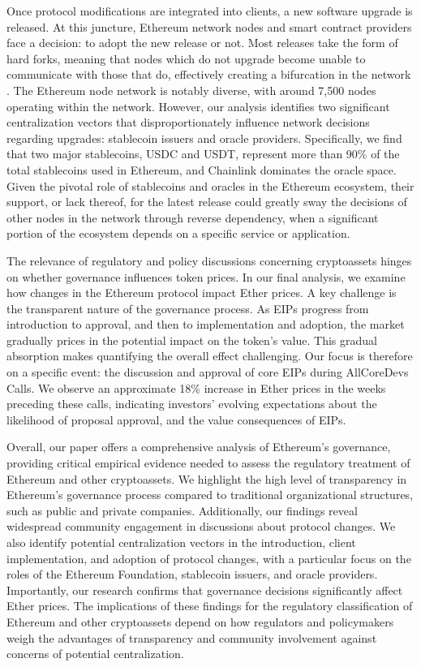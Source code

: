 \documentclass[No]{AEA}
\begin{document}
Once protocol modifications are integrated into clients, a new software upgrade is released. At this juncture, Ethereum network nodes and smart contract providers face a decision: to adopt the new release or not. Most releases take the form of hard forks, meaning that nodes which do not upgrade become unable to communicate with those that do, effectively creating a bifurcation in the network \citep{FS:20}. The Ethereum node network is notably diverse, with around 7,500 nodes operating within the network. However, our analysis identifies two significant centralization vectors that disproportionately influence network decisions regarding upgrades: stablecoin issuers and oracle providers. Specifically, we find that two major stablecoins, USDC and USDT, represent more than 90\% of the total stablecoins used in Ethereum, and Chainlink dominates the oracle space. Given the pivotal role of stablecoins and oracles in the Ethereum ecosystem, their support, or lack thereof, for the latest release could greatly sway the decisions of other nodes in the network through reverse dependency, when a significant portion of the ecosystem depends on a specific service or application. 

The relevance of regulatory and policy discussions concerning cryptoassets hinges on whether governance influences token prices. In our final analysis, we examine how changes in the Ethereum protocol impact Ether prices. A key challenge is the transparent nature of the governance process. As EIPs progress from introduction to approval, and then to implementation and adoption, the market gradually prices in the potential impact on the token’s value. This gradual absorption makes quantifying the overall effect challenging. Our focus is therefore on a specific event: the discussion and approval of core EIPs during AllCoreDevs Calls. We observe an approximate 18\% increase in Ether prices in the weeks preceding these calls, indicating investors' evolving expectations about the likelihood of proposal approval, and the value consequences of EIPs. 

Overall, our paper offers a comprehensive analysis of Ethereum's governance, providing critical empirical evidence needed to  assess the regulatory treatment of Ethereum and other cryptoassets. We highlight the high level of transparency in Ethereum's governance process compared to traditional organizational structures, such as public and private companies. Additionally, our findings reveal widespread community engagement in discussions about protocol changes. We also identify potential centralization vectors in the introduction, client implementation, and adoption of protocol changes, with a particular focus on the roles of the Ethereum Foundation, stablecoin issuers, and oracle providers. Importantly, our research confirms that governance decisions significantly affect Ether prices. The implications of these findings for the regulatory classification of Ethereum and other cryptoassets depend on how regulators and policymakers weigh the advantages of transparency and community involvement against concerns of potential centralization.
\end{document}
